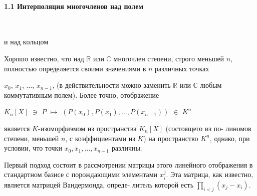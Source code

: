 \paragraph{ 1.1 Интерполяция многочленов над полем} \ 

\vspace{0pt} \hspace{10pt}$\mathbf{и}$ $\mathbf{над}$ $\mathbf{кольцом}$ \ 

\vspace{8pt}\noindent Хорошо известно, что над $\mathbb R$ или $\mathbb C$ многочлен степени, строго меньшей \linebreak
$n$, полностью определяется своими значениями в $n$ различных точках \linebreak

\newpage
{}

\noindent $x_0$, $x_1$, $\dots$, $x_{n-1}$, (в действительности можно заменить $\mathbb R$ или $\mathbb C$ любым \linebreak
коммутативным полем). Более точно, отображение

\begin{center}
$K_n[X]$ $\ni$ $P$ $\mapsto$ $( P(x_0), P(x_1), \dots,  P(x_{n-1}))$ $\in$ $K^n$
\end{center}

\noindent является $K$-изоморфиэмом из пространства $K_n[X]$ (состоящего из по­- \linebreak
линомов степени, меньшей $n$, с коэффициентами из $K$)  на пространство \linebreak
 $K^n$, однако, при условии, что точки $x_0, x_1, \dots, x_{n-1}$ различны. \ 

\vspace{0pt}Первый подход состоит в рассмотрении матрицы этого линейного\linebreak
отображения в стандартном базисе с порождающими элементами $x^j_i$. \linebreak
Эта матрица, как известно, является матрицей Вандермонда, опреде­- \linebreak
литель которой есть $\prod_{i<j}(x_j - x_i)$. \ 

